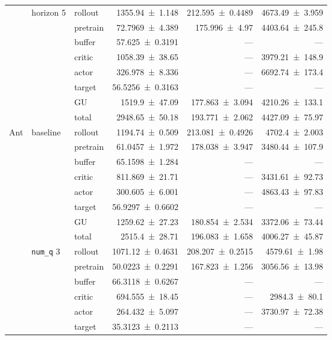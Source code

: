 {\begin{longtable}{@{}lllrrr@{}}
    \addlinespace[2pt]
     & horizon 5 & rollout & \num{1355.94+-1.148} & \num{212.595+-0.4489} & \num{4673.49+-3.959} \\
     &  & pretrain & \num{72.7969+-4.389} & \num{175.996+-4.97} & \num{4403.64+-245.8} \\
     &  & buffer & \num{57.625+-0.3191} & --- & --- \\
     &  & critic & \num{1058.39+-38.65} & --- & \num{3979.21+-148.9} \\
     &  & actor & \num{326.978+-8.336} & --- & \num{6692.74+-173.4} \\
     &  & target & \num{56.5256+-0.3163} & --- & --- \\
     &  & GU & \num{1519.9+-47.09} & \num{177.863+-3.094} & \num{4210.26+-133.1} \\
     &  & total & \num{2948.65+-50.18} & \num{193.771+-2.062} & \num{4427.09+-75.97} \\
    \addlinespace[2pt]
    \midrule
    Ant & baseline & rollout & \num{1194.74+-0.509} & \num{213.081+-0.4926} & \num{4702.4+-2.003} \\
     &  & pretrain & \num{61.0457+-1.972} & \num{178.038+-3.947} & \num{3480.44+-107.9} \\
     &  & buffer & \num{65.1598+-1.284} & --- & --- \\
     &  & critic & \num{811.869+-21.71} & --- & \num{3431.61+-92.73} \\
     &  & actor & \num{300.605+-6.001} & --- & \num{4863.43+-97.83} \\
     &  & target & \num{56.9297+-0.6602} & --- & --- \\
     &  & GU & \num{1259.62+-27.23} & \num{180.854+-2.534} & \num{3372.06+-73.44} \\
     &  & total & \num{2515.4+-28.71} & \num{196.083+-1.658} & \num{4006.27+-45.87} \\
    \addlinespace[2pt]
     & \texttt{num\_q} 3 & rollout & \num{1071.12+-0.4631} & \num{208.207+-0.2515} & \num{4579.61+-1.98} \\
     &  & pretrain & \num{50.0223+-0.2291} & \num{167.823+-1.256} & \num{3056.56+-13.98} \\
     &  & buffer & \num{66.3118+-0.6267} & --- & --- \\
     &  & critic & \num{694.555+-18.45} & --- & \num{2984.3+-80.1} \\
     &  & actor & \num{264.432+-5.097} & --- & \num{3730.97+-72.38} \\
     &  & target & \num{35.3123+-0.2113} & --- & --- \\

\end{longtable}}

